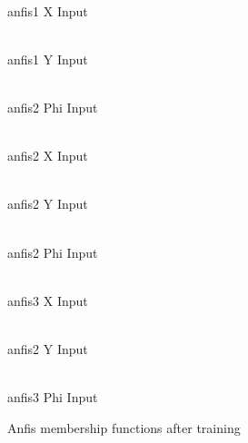 \documentclass[a4paper,11pt]{article}
\begin{document}
\begin{figure}[H]

\begin{minipage}{.32\linewidth}
\centering
{}\\{anfis1 X Input}
\end{minipage}
\begin{minipage}{.32\linewidth}
\centering
{}\\{anfis1 Y Input}
\end{minipage}
\begin{minipage}{.32\linewidth}
\centering
{}\\{anfis2 Phi Input}
\end{minipage}\par\medskip

\begin{minipage}{.32\linewidth}
\centering
{}\\{anfis2 X Input }
\end{minipage}
\begin{minipage}{.32\linewidth}
\centering
{}\\{anfis2 Y Input}
\end{minipage}
\begin{minipage}{.32\linewidth}
\centering
{}\\{anfis2 Phi Input}
\end{minipage}\par\medskip

\begin{minipage}{.32\linewidth}
\centering
{}\\{anfis3 X Input}
\end{minipage}
\begin{minipage}{.32\linewidth}
\centering
{}\\{anfis2 Y Input}
\end{minipage}
\begin{minipage}{.32\linewidth}
\centering
{}\\{anfis3 Phi Input}
\end{minipage}

\caption{Anfis membership functions after training}
\label{fig:memb}
\end{figure}
\end{document}
